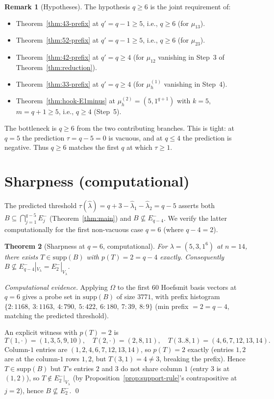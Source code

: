 \documentclass[11pt]{article}
\newtheorem{theorem}{Theorem}
\theoremstyle{definition}
\newtheorem{remark}[theorem]{Remark}
\newcommand{\Om}{\Omega}
\newcommand{\hatl}{\widehat\lambda}
\newcommand{\supp}{\mathrm{supp}}
\begin{document}
\begin{remark}[Hypotheses]\label{rem:hyp}
The hypothesis $q \ge 6$ is the joint requirement of:
\begin{itemize}[topsep=0.2em,itemsep=0.1em]
\item Theorem~\ref{thm:43-prefix} at $q' = q - 1 \ge 5$, i.e., $q \ge 6$
   (for $\mu_{13}$).
\item Theorem~\ref{thm:52-prefix} at $q' = q - 1 \ge 5$, i.e., $q \ge 6$
   (for $\mu_{23}$).
\item Theorem~\ref{thm:42-prefix} at $q' = q \ge 4$ (for $\mu_{12}$
   vanishing in Step~3 of Theorem~\ref{thm:reduction}).
\item Theorem~\ref{thm:33-prefix} at $q' = q \ge 4$ (for $\mu_h^{(1)}$
   vanishing in Step~4).
\item Theorem~\ref{thm:hook-E1minus} at $\mu_h^{(2)} = (5, 1^{q+1})$
   with $k = 5$, $m = q+1 \ge 5$, i.e., $q \ge 4$ (Step~5).
\end{itemize}
The bottleneck is $q \ge 6$ from the two contributing branches.  This
is tight: at $q = 5$ the prediction $\tau = q - 5 = 0$ is vacuous, and
at $q \le 4$ the prediction is negative.  Thus $q \ge 6$ matches the
first $q$ at which $\tau \ge 1$.
\end{remark}

\section{Sharpness (computational)}\label{sec:sharp}

The predicted threshold $\tau(\hatl) = q + 3 - \hatl_1 - \hatl_2 =
q - 5$ asserts both $B \subseteq \bigcap_{j=1}^{q-5} E_j^-$
(Theorem~\ref{thm:main}) and $B \not\subseteq E_{q-4}^-$.  We verify
the latter computationally for the first non-vacuous case $q = 6$
(where $q - 4 = 2$).

\begin{theorem}[Sharpness at $q = 6$, computational]\label{thm:sharp-q6}
For $\lambda = (5, 3, 1^6)$ at $n = 14$, there exists $T \in \supp(B)$
with $p(T) = 2 = q - 4$ exactly.  Consequently $B \not\subseteq
E_{q-4}^-|_{V_\lambda} = E_2^-|_{V_\lambda}$.
\end{theorem}

\begin{proof}[Computational evidence]
Applying $\Om$ to the first $60$ Hoefsmit basis vectors at $q = 6$
gives a probe set in $\supp(B)$ of size $3771$, with prefix histogram
$\{2: 1168,\ 3: 1163,\ 4: 790,\ 5: 422,\ 6: 180,\ 7: 39,\ 8: 9\}$
(min prefix $= 2 = q - 4$, matching the predicted threshold).

An explicit witness with $p(T) = 2$ is
\[
   T(1, \cdot) = (1, 3, 5, 9, 10),
   \quad T(2, \cdot) = (2, 8, 11),
   \quad T(3..8, 1) = (4, 6, 7, 12, 13, 14).
\]
Column-$1$ entries are $(1, 2, 4, 6, 7, 12, 13, 14)$, so $p(T) = 2$
exactly (entries $1, 2$ are at the column-$1$ rows $1, 2$, but
$T(3, 1) = 4 \ne 3$, breaking the prefix).  Hence $T \in \supp(B)$
but $T$'s entries $2$ and $3$ do not share column $1$ (entry $3$ is
at $(1, 2)$), so $T \notin E_2^-|_{V_\lambda}$ (by
Proposition~\ref{prop:support-rule}'s contrapositive at $j = 2$),
hence $B \not\subseteq E_2^-$.
\qed
\end{proof}
\end{document}
